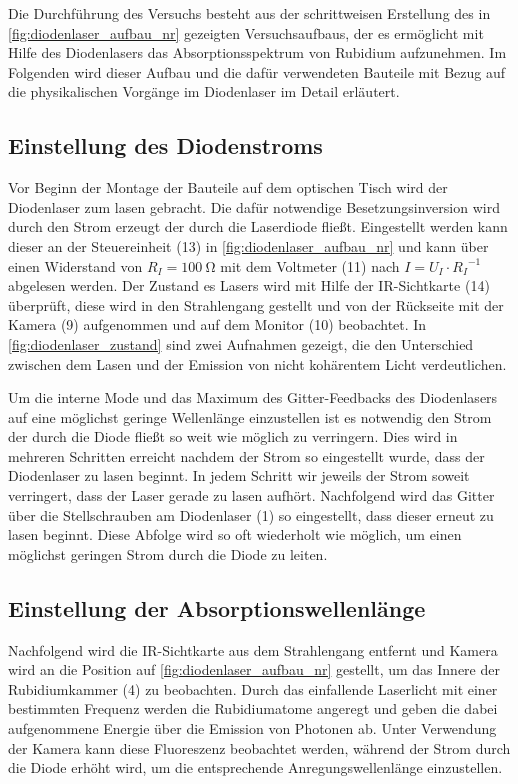 
Die Durchführung des Versuchs besteht aus der schrittweisen Erstellung des in \cref{fig:diodenlaser_aufbau_nr}
gezeigten Versuchsaufbaus, der es ermöglicht mit Hilfe des Diodenlasers das Absorptionsspektrum
von Rubidium aufzunehmen. Im Folgenden wird dieser Aufbau und die dafür verwendeten Bauteile 
mit Bezug auf die physikalischen Vorgänge im Diodenlaser im Detail erläutert.



\subsection{Einstellung des Diodenstroms} \label{sec:einstellung_diodenstrom}
Vor Beginn der Montage der Bauteile auf dem optischen Tisch wird der Diodenlaser zum lasen gebracht.
Die dafür notwendige Besetzungsinversion wird durch den Strom erzeugt der durch die Laserdiode 
fließt. Eingestellt werden kann dieser an der Steuereinheit (13) in \cref{fig:diodenlaser_aufbau_nr} und
kann über einen Widerstand von $R_{I} = \SI{100}{\ohm}$ mit dem Voltmeter (11) nach
$I = U_{I} \cdot {R_{I}}^{-1}$ abgelesen werden. 
Der Zustand es Lasers wird mit Hilfe der IR-Sichtkarte (14) überprüft, diese wird in den Strahlengang 
gestellt und von der Rückseite mit der Kamera (9) aufgenommen und auf dem Monitor (10) beobachtet.
In \cref{fig:diodenlaser_zustand} sind zwei Aufnahmen gezeigt, die den Unterschied zwischen dem Lasen und der 
Emission von nicht kohärentem Licht verdeutlichen.



Um die interne Mode und das Maximum des Gitter-Feedbacks des Diodenlasers auf eine möglichst 
geringe Wellenlänge einzustellen ist es notwendig den Strom der durch die Diode fließt so weit 
wie möglich zu verringern.
Dies wird in mehreren Schritten erreicht nachdem der Strom so eingestellt wurde, dass 
der Diodenlaser zu lasen beginnt. In jedem Schritt wir jeweils der Strom soweit verringert,
dass der Laser gerade zu lasen aufhört. Nachfolgend wird das Gitter über die Stellschrauben 
am Diodenlaser (1) so eingestellt, dass dieser erneut zu lasen beginnt. Diese Abfolge wird
so oft wiederholt wie möglich, um einen möglichst geringen Strom durch die Diode zu leiten. 

\subsection{Einstellung der Absorptionswellenlänge}
Nachfolgend wird die IR-Sichtkarte aus dem Strahlengang entfernt und Kamera wird an die 
Position auf \cref{fig:diodenlaser_aufbau_nr} gestellt, um das Innere der Rubidiumkammer (4)
zu beobachten. Durch das einfallende Laserlicht mit einer bestimmten Frequenz werden 
die Rubidiumatome angeregt und geben die dabei aufgenommene Energie über die Emission von
Photonen ab. Unter Verwendung der Kamera kann diese Fluoreszenz beobachtet werden, während
der Strom durch die Diode erhöht wird, um die entsprechende Anregungswellenlänge einzustellen.


